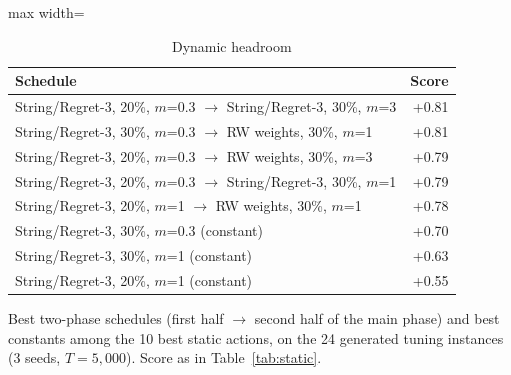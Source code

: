 \begin{table}[h]
\centering
\caption{Dynamic headroom}\label{tab:dynhead}
\setlength{\tabcolsep}{3pt}\small
\begin{adjustbox}{max width=\linewidth}
\begin{tabular}{lr}
\toprule
Schedule & Score\\ \midrule
String/Regret-3, 20\%, $m$=0.3 $\rightarrow$ String/Regret-3, 30\%, $m$=3 & +0.81\\
String/Regret-3, 30\%, $m$=0.3 $\rightarrow$ RW weights, 30\%, $m$=1 & +0.81\\
String/Regret-3, 20\%, $m$=0.3 $\rightarrow$ RW weights, 30\%, $m$=3 & +0.79\\
String/Regret-3, 20\%, $m$=0.3 $\rightarrow$ String/Regret-3, 30\%, $m$=1 & +0.79\\
String/Regret-3, 20\%, $m$=1 $\rightarrow$ RW weights, 30\%, $m$=1 & +0.78\\
String/Regret-3, 30\%, $m$=0.3 (constant) & +0.70\\
String/Regret-3, 30\%, $m$=1 (constant) & +0.63\\
String/Regret-3, 20\%, $m$=1 (constant) & +0.55\\
\bottomrule
\end{tabular}
\end{adjustbox}
\par\vspace{2pt}\parbox{\linewidth}{\footnotesize Best two-phase schedules (first half $\rightarrow$ second half of the main phase) and best constants among the 10 best static actions, on the 24 generated tuning instances (3 seeds, $T=5{,}000$). Score as in Table~\ref{tab:static}.}
\end{table}
